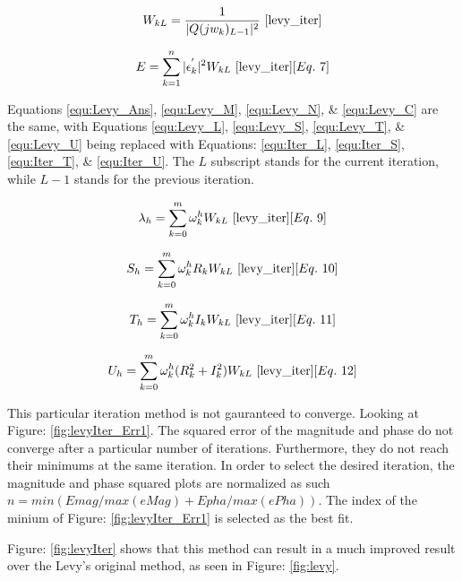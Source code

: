 \begin{equation}
\label{equ:iter_Weight}
W_{kL} = \frac{1}{|Q(jw_k)_{L-1}|^2}
~\cite{levy_iter}
\end{equation}

\begin{equation}
\label{equ:iter_Err}
E = \sum_{k=1}^{n} |\epsilon _k ^{'}|^2W_{kL}
~\cite{levy_iter}[Eq.~7]
\end{equation}

Equations \eqref{equ:Levy_Ans}, \eqref{equ:Levy_M}, \eqref{equ:Levy_N}, \& \eqref{equ:Levy_C} are the same, with Equations \eqref{equ:Levy_L}, \eqref{equ:Levy_S}, \eqref{equ:Levy_T}, \& \eqref{equ:Levy_U} being replaced with Equations: \eqref{equ:Iter_L}, \eqref{equ:Iter_S}, \eqref{equ:Iter_T}, \& \eqref{equ:Iter_U}.
The $L$ subscript stands for the current iteration, while $L-1$ stands for the previous iteration.

\begin{equation}
\label{equ:Iter_L}
\lambda _h = \sum_{k=0}^{m} \omega _k ^hW_{kL}
~\cite{levy_iter}[Eq.~9]
\end{equation}

\begin{equation}
\label{equ:Iter_S}
S_h = \sum_{k=0}^{m} \omega _k ^h R_kW_{kL}
~\cite{levy_iter}[Eq.~10]
\end{equation}

\begin{equation}
\label{equ:Iter_T}
T_h = \sum_{k=0}^{m} \omega _k ^h I_kW_{kL}
~\cite{levy_iter}[Eq.~11]
\end{equation}

\begin{equation}
\label{equ:Iter_U}
U_h = \sum_{k=0}^{m} \omega _k ^h (R_k ^2 + I_k ^2)W_{kL}
~\cite{levy_iter}[Eq.~12]
\end{equation}


This particular iteration method is not gauranteed to converge. Looking at Figure: \ref{fig:levyIter_Err1}. The squared error of the magnitude and phase do not converge after a particular number of iterations. Furthermore, they do not reach their minimums at the same iteration. In order to select the desired iteration, the magnitude and phase squared plots are normalized as such $n = min(Emag/max(eMag) + Epha/max(ePha))$. The index of the minium of Figure: \ref{fig:levyIter_Err1} is selected as the best fit.




Figure: \ref{fig:levyIter} shows that this method can result in a much improved result over the Levy's original method, as seen in Figure: \ref{fig:levy}.

